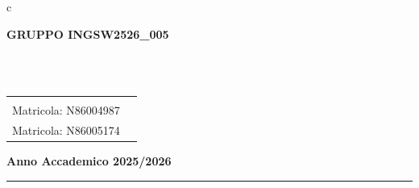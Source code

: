 \documentclass[a4paper,12pt]{article}
\begin{document}
\begin{titlepage}
\begin{center}
\vspace{0.5cm}

\begin{tcolorbox}[
    enhanced,
    colback=white,
    colframe=UninaBlue!50,
    boxrule=0.8pt,
    arc=4pt,
    width=0.8\textwidth,
    title=Candidati,
    fonttitle=\bfseries\color{UninaBlue},
    coltitle=UninaBlue
]
    \centering
    \begin{tabular}{c}
        \begin{minipage}{0.8\textwidth}
            \centering
            {\large \textbf{GRUPPO INGSW2526\_005}}\\[0.2cm]
        \end{minipage}
        \\[0.1cm]
        \hline
        \\[0.01cm]
        \begin{tabular}{cc}
            \begin{minipage}{0.4\textwidth}
                \centering
                {\normalsize \textbf{Virginia Antonia Esposito}}\\[0.1cm]
                {\small Matricola: N86004987}
            \end{minipage}
            &
            \begin{minipage}{0.4\textwidth}
                \centering
                {\normalsize \textbf{Giuseppe Paolo Esposito}}\\[0.1cm]
                {\small Matricola: N86005174}
            \end{minipage}
        \end{tabular}
    \end{tabular}
\end{tcolorbox}

\vspace{0.1cm}

\begin{tcolorbox}[
    enhanced,
    colback=UninaBlue!10,
    colframe=UninaBlue,
    boxrule=0.8pt,
    arc=4pt,
    width=0.35\textwidth
]
    \centering
    {\small \textbf{Anno Accademico 2025/2026}}\\[0.1cm]
\end{tcolorbox}

\vfill
\rule{0.6\textwidth}{0.8pt}\\[0.3cm]

\end{center}
\restoregeometry
\nopagecolor
\end{titlepage}
\end{document}
